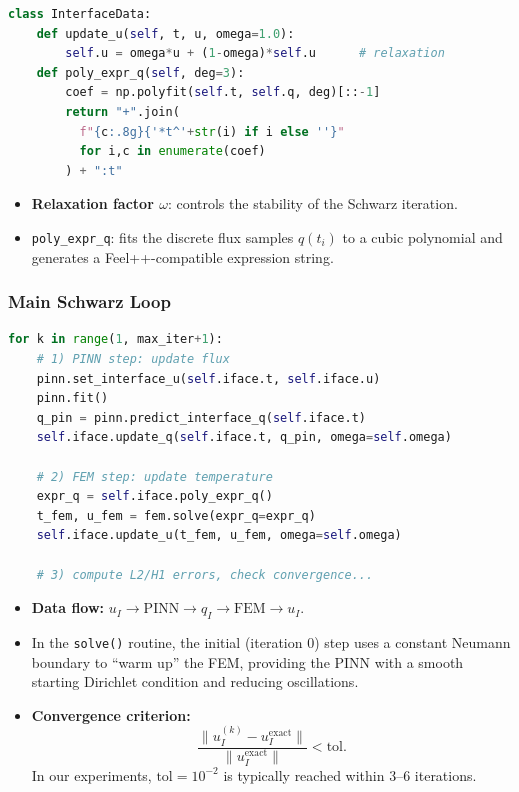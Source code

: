\documentclass[12pt]{article}
\begin{document}
\begin{lstlisting}[language=Python,caption={InterfaceData methods}]
class InterfaceData:
    def update_u(self, t, u, omega=1.0):
        self.u = omega*u + (1-omega)*self.u      # relaxation
    def poly_expr_q(self, deg=3):
        coef = np.polyfit(self.t, self.q, deg)[::-1]
        return "+".join(
          f"{c:.8g}{'*t^'+str(i) if i else ''}"
          for i,c in enumerate(coef)
        ) + ":t"
\end{lstlisting}

\begin{itemize}
  \item \textbf{Relaxation factor \(\omega\)}: controls the stability of the Schwarz iteration.
  \item \texttt{poly\_expr\_q}: fits the discrete flux samples \(q(t_i)\) to a cubic polynomial and generates a Feel++-compatible expression string.
\end{itemize}

\subsubsection{Main Schwarz Loop}

\begin{lstlisting}[language=Python,caption={Key Schwarz iteration steps}]
for k in range(1, max_iter+1):
    # 1) PINN step: update flux
    pinn.set_interface_u(self.iface.t, self.iface.u)
    pinn.fit()
    q_pin = pinn.predict_interface_q(self.iface.t)
    self.iface.update_q(self.iface.t, q_pin, omega=self.omega)

    # 2) FEM step: update temperature
    expr_q = self.iface.poly_expr_q()
    t_fem, u_fem = fem.solve(expr_q=expr_q)
    self.iface.update_u(t_fem, u_fem, omega=self.omega)

    # 3) compute L2/H1 errors, check convergence...
\end{lstlisting}

\begin{itemize}
  \item \textbf{Data flow:} \(u_I \to \text{PINN} \to q_I \to \text{FEM} \to u_I\).
  \item In the \texttt{solve()} routine, the initial (iteration 0) step uses a constant Neumann boundary to “warm up” the FEM, providing the PINN with a smooth starting Dirichlet condition and reducing oscillations.
  \item \textbf{Convergence criterion:}
  \begin{equation}
    \frac{\|u_I^{(k)} - u_I^{\mathrm{exact}}\|}
         {\|u_I^{\mathrm{exact}}\|}
    < \text{tol}.
  \end{equation}
  In our experiments, \(\text{tol}=10^{-2}\) is typically reached within 3–6 iterations.
\end{itemize}
\end{document}
